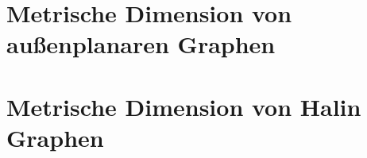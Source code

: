 \section{Metrische Dimension von außenplanaren Graphen%
}

\section{Metrische Dimension von Halin Graphen} 
